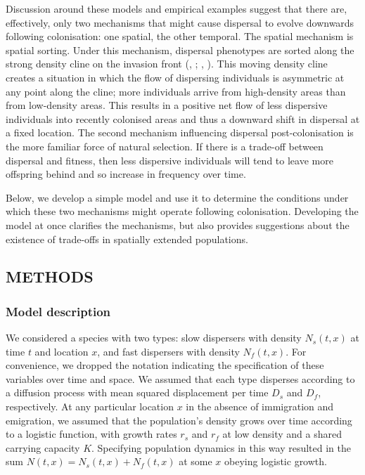 \documentclass[11pt]{article}
\newcommand{\Cite}[1]{\citeauthor{#1}, \citeyear{#1}}
\begin{document}
Discussion around these models and empirical examples suggest that there are, effectively, only two mechanisms that might cause dispersal to evolve downwards following colonisation: one spatial, the other temporal. The spatial mechanism is spatial sorting. Under this mechanism, dispersal phenotypes are sorted along the strong density cline on the invasion front (\Cite{Shine2011a}; \Cite{Benichou2012}). This moving density cline creates a situation in which the flow of dispersing individuals is asymmetric at any point along the cline; more individuals arrive from high-density areas than from low-density areas. This results in a positive net flow of less dispersive individuals into recently colonised areas and thus a downward shift in dispersal at a fixed location. The second mechanism influencing dispersal post-colonisation is the more familiar force of natural selection. If there is a trade-off between dispersal and fitness, then less dispersive individuals will tend to leave more offspring behind and so increase in frequency over time. 

Below, we develop a simple model and use it to determine the conditions under which these two mechanisms might operate following colonisation.  Developing the model at once clarifies the mechanisms, but also provides suggestions about the existence of trade-offs in spatially extended populations.


\subsection*{METHODS}

\subsubsection*{Model description}

We considered a species with two types: slow dispersers with density $N_s(t,x)$ at time $t$ and location $x$, and fast dispersers with density $N_f(t,x)$. For convenience, we dropped the notation indicating the specification of these variables over time and space. We assumed that each type disperses according to a diffusion process with mean squared displacement per time $D_s$ and $D_f$, respectively. At any particular location $x$ in the absence of immigration and emigration, we assumed that the population's density grows over time according to a logistic function, with growth rates $r_s$ and $r_f$ at low density and a shared carrying capacity $K$. Specifying population dynamics in this way resulted in the sum $N(t,x) = N_s(t,x) + N_f(t,x)$ at some $x$ obeying logistic growth.
\end{document}
